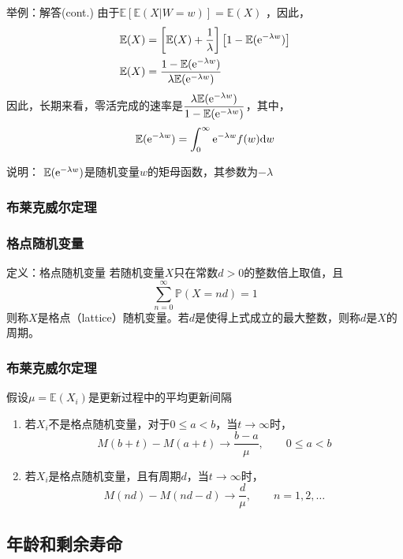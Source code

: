 \documentclass[t]{beamer}
\renewcommand{\Pr}{\mathbb{P}}
\newcommand{\E}{\mathbb{E}}
\begin{document}
\begin{frame}{举例：解答(cont.)}
由于$\E[\E(X|W=w)]=\E(X)$
，因此，
\[\begin{split}
   \E(X)&=\left[\E(X)+\frac{1}{\lambda}\right]\left[1-\E({\rm e}^{-\lambda w})\right]
   \\
   \E(X) &=\frac{1-\E({\rm e}^{-\lambda w})}{\lambda \E({\rm e}^{-\lambda w})}
\end{split}\]
因此，长期来看，零活完成的速率是$\dfrac{\lambda \E({\rm e}^{-\lambda w})}{1-\E({\rm e}^{-\lambda w})}$，其中，$$\E({\rm e}^{-\lambda w})=\int^{\infty}_0 {\rm e}^{-\lambda w}f(w)\dd w$$
\begin{block}{说明：}
  $\E({\rm e}^{-\lambda w})$是随机变量$w$的矩母函数，其参数为$-\lambda$
\end{block}
\end{frame}








\subsubsection{布莱克威尔定理}
\begin{frame}
  \frametitle{格点随机变量}
\begin{block}{定义：格点随机变量}
  若随机变量$X$只在常数$d>0$的整数倍上取值，且 
  \[\sum^{\infty}_{n=0}\Pr(X=nd)=1\]
  则称$X$是格点（lattice）随机变量。若$d$是使得上式成立的最大整数，则称$d$是$X$的周期。
\end{block}
  

\end{frame}


\begin{frame}
  \frametitle{布莱克威尔定理}
  假设$\mu=\E(X_i)$是更新过程中的平均更新间隔
  \begin{enumerate}
      \item 若$X_i$不是格点随机变量，对于$0\le a<b$，当$t\to\infty$时，
  \[M(b+t)-M(a+t)\to \frac{b-a}{\mu},\qquad 0\le a<b\]
      \item 若$X_i$是格点随机变量，且有周期$d$，当$t\to\infty$时，
      \[M(nd)-M(nd-d)\to \frac{d}{\mu},\qquad n=1,2,\ldots\]
  \end{enumerate}

  

\end{frame}

\subsection{年龄和剩余寿命}
\end{document}
